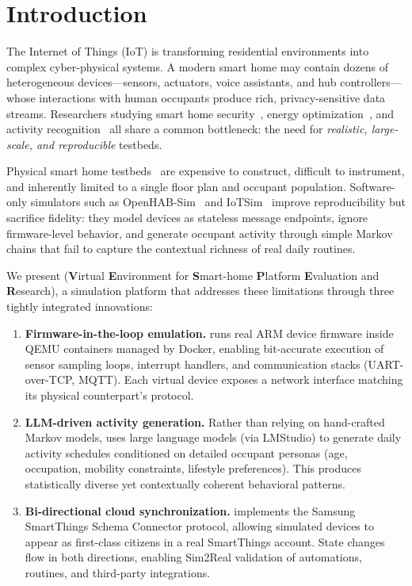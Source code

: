 \section{Introduction}\label{sec:intro}

The Internet of Things (IoT) is transforming residential environments
into complex cyber-physical systems.  A modern smart home may contain
dozens of heterogeneous devices---sensors, actuators, voice assistants,
and hub controllers---whose interactions with human occupants produce
rich, privacy-sensitive data streams.  Researchers studying smart home
security~\cite{iot-security-survey}, energy optimization~\cite{iot-energy-survey}, and activity
recognition~\cite{har-survey} all share a common bottleneck: the need for
\emph{realistic, large-scale, and reproducible} testbeds.

Physical smart home testbeds~\cite{iot-testbed-survey} are expensive to construct,
difficult to instrument, and inherently limited to a single floor plan
and occupant population.  Software-only simulators such as
OpenHAB-Sim~\cite{openhab-sim} and IoTSim~\cite{iotsim} improve reproducibility but
sacrifice fidelity: they model devices as stateless message endpoints,
ignore firmware-level behavior, and generate occupant activity through
simple Markov chains that fail to capture the contextual richness of
real daily routines.

We present \sys{} (\textbf{V}irtual \textbf{E}nvironment for
\textbf{S}mart-home \textbf{P}latform \textbf{E}valuation and
\textbf{R}esearch), a simulation platform that addresses these
limitations through three tightly integrated innovations:

\begin{enumerate}[leftmargin=*]
  \item \textbf{Firmware-in-the-loop emulation.}
    \sys{} runs real ARM device firmware inside QEMU containers
    managed by Docker, enabling bit-accurate execution of sensor
    sampling loops, interrupt handlers, and communication stacks
    (UART-over-TCP, MQTT).  Each virtual device exposes a network
    interface matching its physical counterpart's protocol.

  \item \textbf{LLM-driven activity generation.}
    Rather than relying on hand-crafted Markov models, \sys{} uses
    large language models (via LMStudio) to generate daily activity
    schedules conditioned on detailed occupant personas (age,
    occupation, mobility constraints, lifestyle preferences).  This
    produces statistically diverse yet contextually coherent
    behavioral patterns.

  \item \textbf{Bi-directional cloud synchronization.}
    \sys{} implements the Samsung SmartThings Schema Connector
    protocol, allowing simulated devices to appear as first-class
    citizens in a real SmartThings account.  State changes flow
    in both directions, enabling Sim2Real validation of automations,
    routines, and third-party integrations.
\end{enumerate}

